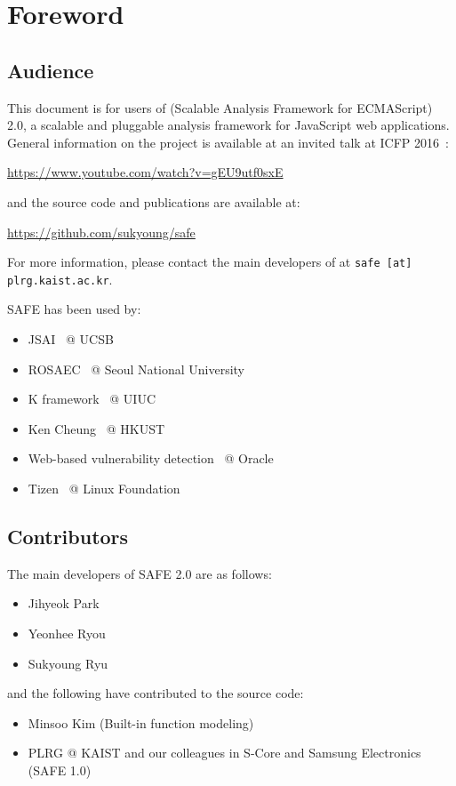 \chapter{Foreword}
\label{c:1:foreword}

\section{Audience}
This document is for users of \safe (Scalable Analysis Framework for ECMAScript)
2.0, a scalable and pluggable analysis framework for JavaScript web applications.
General information on the \safe project is available at an invited talk at ICFP 2016~\cite{safeicfp16}:
\begin{center}
  \url{https://www.youtube.com/watch?v=gEU9utf0sxE}
\end{center}
and the source code and publications are available at:
\begin{center}
  \url{https://github.com/sukyoung/safe}
\end{center}
For more information, please contact the main developers of \safe
at \texttt{safe [at] plrg.kaist.ac.kr}.

SAFE has been used by:
\begin{itemize}
\itemsep-.2em
\item JSAI~\cite{jsai} @ UCSB
\item ROSAEC~\cite{rosaec} @ Seoul National University
\item K framework~\cite{kjs} @ UIUC
\item Ken Cheung~\cite{emse16} @ HKUST
\item Web-based vulnerability detection~\cite{oracle} @ Oracle
\item Tizen~\cite{tizen} @ Linux Foundation
\end{itemize}

\section{Contributors}
The main developers of SAFE 2.0 are as follows:
\begin{itemize}
\itemsep-.2em
\item Jihyeok Park
\item Yeonhee Ryou
\item Sukyoung Ryu
\end{itemize}
and the following have contributed to the source code:
\begin{itemize}
\itemsep-.1em
\item Minsoo Kim (Built-in function modeling)
\item PLRG @ KAIST and our colleagues in S-Core and Samsung Electronics (SAFE 1.0)
\end{itemize}


